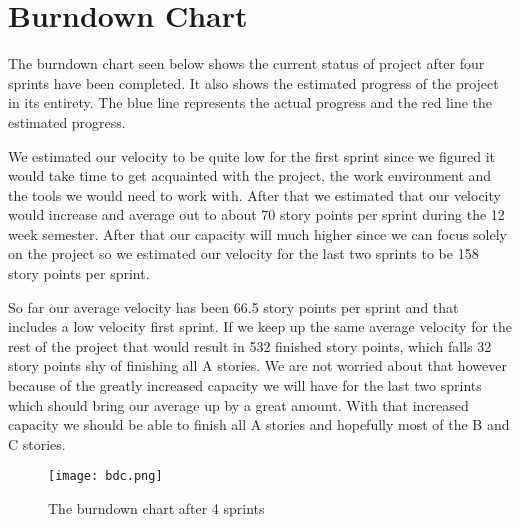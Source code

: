 \section{Burndown Chart}\label{sec:burndown}
The burndown chart seen below shows the current status of project after four sprints have been completed. It also shows the estimated progress of the project in its entirety. The blue line represents the actual progress and the red line the estimated progress. 

We estimated our velocity to be quite low for the first sprint since we figured it would take time to get acquainted with the project, the work environment and the tools we would need to work with. After that we estimated that our velocity would increase and average out to about 70 story points per sprint during the 12 week semester. After that our capacity will much higher since we can focus solely on the project so we estimated our velocity for the last two sprints to be 158 story points per sprint. 

So far our average velocity has been 66.5 story points per sprint and that includes a low velocity first sprint. If we keep up the same average velocity for the rest of the project that would result in 532 finished story points, which falls 32 story points shy of finishing all A stories. We are not worried about that however because of the greatly increased capacity we will have for the last two sprints which should bring our average up by a great amount. With that increased capacity we should be able to finish all A stories and hopefully most of the B and C stories.

\begin{figure}[H]
	\centering
	\graphicspath{ {./graphics/} }
    \centerline{\texttt{[image: bdc.png]}}
    \caption{\label{fig:bdchart}The burndown chart after 4 sprints}
\end{figure}